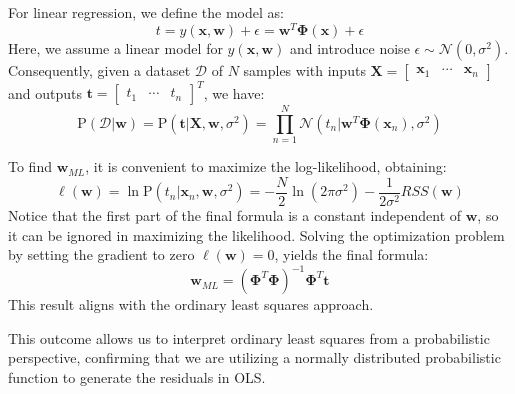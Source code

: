 For linear regression, we define the model as:
\[t=y(\textbf{x},\textbf{w})+\epsilon=\textbf{w}^T\boldsymbol{\Phi}(\textbf{x})+\epsilon\]
Here, we assume a linear model for $y(\textbf{x},\textbf{w})$ and introduce noise  $\epsilon\sim\mathcal{N}(0,\sigma^2)$. 
Consequently, given a dataset $\mathcal{D}$ of $N$ samples with inputs $\textbf{X}=\begin{bmatrix}\textbf{x}_1 & \cdots & \textbf{x}_n \end{bmatrix}$ and outputs $\textbf{t}=\begin{bmatrix}t_1 & \cdots & t_n \end{bmatrix}^T$, we have: 
\[\text{P}(\mathcal{D}|\textbf{w})=\text{P}(\textbf{t}|\textbf{X},\textbf{w},\sigma^2)=\prod_{n=1}^{N}\mathcal{N}(t_n|\textbf{w}^T\boldsymbol{\Phi}(\textbf{x}_n),\sigma^2)\]
 
To find $\textbf{w}_{ML}$, it is convenient to maximize the log-likelihood, obtaining:
\[\ell (\textbf{w})=\ln\text{P}(t_n|\textbf{x}_n, \textbf{w} ,\sigma^2)=-\dfrac{N}{2}\ln(2\pi\sigma^2)-\dfrac{1}{2\sigma^2}RSS(\textbf{w})\]
Notice that the first part of the final formula is a constant independent of $\textbf{w}$, so it can be ignored in maximizing the likelihood.
Solving the optimization problem by setting the gradient to zero $\ell (\textbf{w})=0$, yields the final formula:
\[\textbf{w}_{ML}={\left( \boldsymbol{\Phi}^T\boldsymbol{\Phi} \right)}^{-1}\boldsymbol{\Phi}^T\textbf{t}\]
This result aligns with the ordinary least squares approach.

This outcome allows us to interpret ordinary least squares from a probabilistic perspective, confirming that we are utilizing a normally distributed probabilistic function to generate the residuals in OLS.\@

